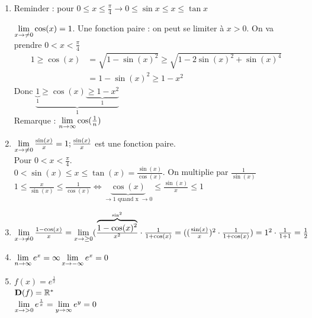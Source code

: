 \documentclass[12pt,a4paper]{article}
\begin{document}
{\begin{enumerate}
\item \begin{boite}
Reminder : pour $0 \leq x \leq \frac{\pi}{4} \to 0 \leq \sin x \leq x \leq \tan x$
\end{boite}
$\lim\limits_{x \to \neq 0} \cos(x) = 1$. Une fonction paire : on peut se limiter à $x > 0$. On va prendre $0 < x < \frac{\pi}{4}$\\
\begin{align*}
1 \geq \cos(x) &= \sqrt{1-\sin(x)^2} \geq \sqrt{1-2\sin(x)^2 + \sin(x)^4}\\
&= 1 - \sin(x)^2 \geq 1-x^2
\end{align*}
Donc $\underbrace{\underbrace{1}_{1} \geq \cos(x) \underbrace{\geq 1-x^2}_{1}}_{1}$\\
Remarque : $\lim\limits_{n \to \infty} \cos(\frac{1}{n})$

\item $\lim\limits_{x \to \neq 0} \frac{\sin(x)}{x} = 1; \frac{\sin(x)}{x}$ est une fonction paire.\\
Pour $0 < x < \frac{\pi}{4}$.\\
$0 < \sin(x) \leq x \leq \tan(x) = \frac{\sin(x)}{\cos(x)}$. On multiplie par $\frac{1}{\sin(x)}$\\
$1 \leq \frac{x}{\sin(x)} \leq \frac{1}{\cos(x)} \Leftrightarrow \underbrace{\cos(x)}_{\to 1\mbox{ 
quand x } \to 0} \leq\frac{\sin(x)}{x} \leq 1$

\item $\lim\limits_{x \to \neq 0} \frac{1-\cos(x)}{x} = \lim\limits_{x \to \geq 0} (\frac{\overbrace{1-\cos(x)^2}^{\sin^2}}{x^2}\cdot \frac{1}{1+\cos(x)} = ((\frac{\sin(x)}{x})^2 \cdot \frac{1}{1+\cos(x)})\\
= 1^2 \cdot \frac{1}{1+1} = \frac{1}{2}$

\item $\lim\limits_{n \to \infty} e^x = \infty\\
\lim\limits_{x \to -\infty} e^x = 0$

\item $f(x) = e^{\frac{1}{x}}$\\
$\mathbf{D}(f) = \mathbb{R}^*$\\
$\lim\limits_{x \to > 0} e^{\frac{1}{x}} = \lim\limits_{y \to \infty}e^y = 0$
\end{enumerate}

}
\end{document}
